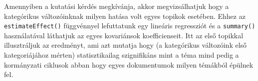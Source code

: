\documentclass[
]{book}
\newenvironment{Shaded}{\begin{snugshade}}{\end{snugshade}}
\newcommand{\AttributeTok}[1]{\textcolor[rgb]{0.77,0.63,0.00}{#1}}
\newcommand{\DecValTok}[1]{\textcolor[rgb]{0.00,0.00,0.81}{#1}}
\newcommand{\FunctionTok}[1]{\textcolor[rgb]{0.00,0.00,0.00}{#1}}
\newcommand{\NormalTok}[1]{#1}
\newcommand{\OtherTok}[1]{\textcolor[rgb]{0.56,0.35,0.01}{#1}}
\newcommand{\SpecialCharTok}[1]{\textcolor[rgb]{0.00,0.00,0.00}{#1}}
\newcommand{\StringTok}[1]{\textcolor[rgb]{0.31,0.60,0.02}{#1}}
\begin{document}
Amennyiben a kutatási kérdés megkívánja, akkor megvizsálhatjuk hogy a
kategórikus változóinknak milyen hatása volt egyes topikok esetében.
Ehhez az \texttt{estimateEffect()} függvénnyel lefuttatunk egy lineáris
regressziót és a \texttt{summary()} használatával láthatjuk az egyes
kovariánsok koefficienseit. Itt az első topikkal illusztráljuk az
eredményt, ami azt mutatja hogy (a kategórikus változóink első
kategoriájához mérten) statisztikailag szignifikáns mint a téma mind
pedig a kormányzati ciklusok abban hogy egyes dokumentumok milyen
témákból épülnek fel.

\begin{Shaded}
\end{Shaded}
\end{document}
